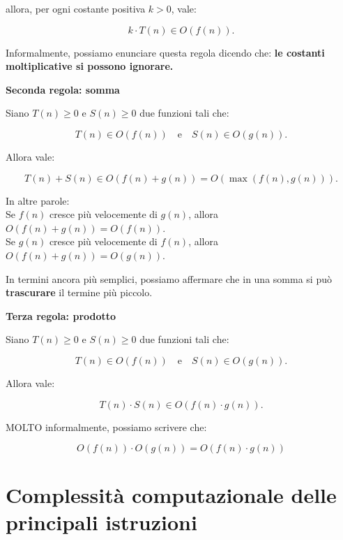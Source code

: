 allora, per ogni costante positiva $k > 0$, vale:

\[
k \cdot T(n) \in O(f(n)).
\]

Informalmente, possiamo enunciare questa regola dicendo che: \textbf{le costanti moltiplicative si possono ignorare.}


\vspace{1cm}
\textbf{Seconda regola: somma}  

Siano $T(n) \ge 0$ e $S(n) \ge 0$ due funzioni tali che:

\[
T(n) \in O(f(n)) \quad \text{e} \quad S(n) \in O(g(n)).
\]

Allora vale:

\[
T(n) + S(n) \in O(f(n) + g(n)) = O(\max(f(n), g(n))).
\]

In altre parole: \\
Se $f(n)$ cresce più velocemente di $g(n)$, allora $O(f(n) + g(n)) = O(f(n))$. \\
Se $g(n)$ cresce più velocemente di $f(n)$, allora $O(f(n) + g(n)) = O(g(n))$.

In termini ancora più semplici, possiamo affermare che in una somma si può \textbf{trascurare} il termine più piccolo.


\vspace{1cm}
\textbf{Terza regola: prodotto}  

Siano $T(n) \ge 0$ e $S(n) \ge 0$ due funzioni tali che:

\[
T(n) \in O(f(n)) \quad \text{e} \quad S(n) \in O(g(n)).
\]

Allora vale:

\[
T(n) \cdot S(n) \in O(f(n) \cdot g(n)).
\]

MOLTO informalmente, possiamo scrivere che:

\[
O(f(n)) \cdot O(g(n)) = O(f(n) \cdot g(n))
\]















\section{Complessità computazionale delle principali istruzioni}







